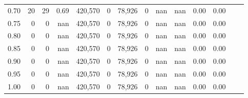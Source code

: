 \begin{tabular}{rrrrrrrrrrrrrr}
0.70 &       20 &      29 &    0.69 &  420,570 &        0 &  78,926 &       0 &   nan &   nan &  0.00 &      0.00 \\
0.75 &        0 &       0 &     nan &  420,570 &        0 &  78,926 &       0 &   nan &   nan &  0.00 &      0.00 \\
0.80 &        0 &       0 &     nan &  420,570 &        0 &  78,926 &       0 &   nan &   nan &  0.00 &      0.00 \\
0.85 &        0 &       0 &     nan &  420,570 &        0 &  78,926 &       0 &   nan &   nan &  0.00 &      0.00 \\
0.90 &        0 &       0 &     nan &  420,570 &        0 &  78,926 &       0 &   nan &   nan &  0.00 &      0.00 \\
0.95 &        0 &       0 &     nan &  420,570 &        0 &  78,926 &       0 &   nan &   nan &  0.00 &      0.00 \\
1.00 &        0 &       0 &     nan &  420,570 &        0 &  78,926 &       0 &   nan &   nan &  0.00 &      0.00 \\
\bottomrule
\end{tabular}
